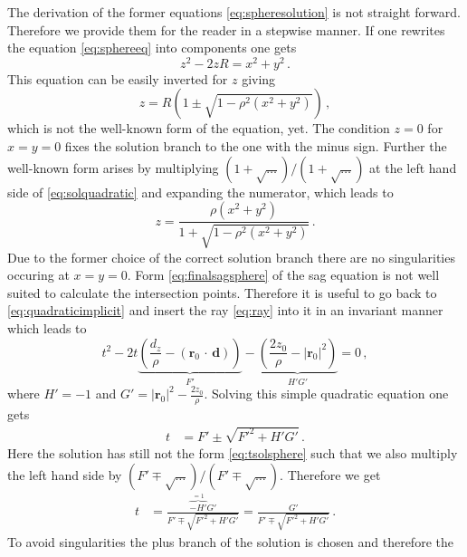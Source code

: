 \documentclass[12pt,a4paper,twoside,openright,BCOR10mm,headsepline,titlepage,abstracton,chapterprefix,final]{scrreprt}
\newcommand\Vector[1]{{\mathbf{#1}}}
\newcommand\Location{\Vector{r}}
\newcommand{\scpm}[2]{(#1\,\cdot\,#2)}
\newif\ifdraft
\begin{document}
\ifdraft
The derivation of the former equations \eqref{eq:spheresolution} is not straight forward. Therefore we provide them for the reader in a stepwise manner.
If one rewrites the equation \eqref{eq:sphereeq} into components one gets
\begin{equation}
 z^2 - 2 z R = x^2 + y^2 \label{eq:quadraticimplicit}\,.
\end{equation}
This equation can be easily inverted for $z$ giving
\begin{equation}
 z = R \left(1\pm\sqrt{1 - \rho^2 (x^2 + y^2)}\right)\label{eq:solquadratic}\,,
\end{equation}
which is not the well-known form of the equation, yet.
The condition $z=0$ for $x=y=0$ fixes the solution branch to the one 
with the minus sign. Further the well-known form arises by multiplying 
$(1+ \sqrt{\dots})/(1+\sqrt{\dots})$ at the left hand side
of \eqref{eq:solquadratic} and expanding the numerator, which leads to
\begin{equation}
 z = \frac{\rho (x^2 + y^2)}{1 + \sqrt{1 - \rho^2 (x^2 + y^2)}} \label{eq:finalsagsphere}\,.
\end{equation}
Due to the former choice of the correct solution branch there are no
singularities occuring at $x=y=0$. Form \eqref{eq:finalsagsphere} of the 
sag equation is not well suited to calculate the intersection points. Therefore it is 
useful to go back to \eqref{eq:quadraticimplicit} and insert the ray \eqref{eq:ray}
into it in an invariant manner which leads to
\begin{equation}
 t^2 - 2 t \underbrace{\left(\frac{d_z}{\rho} - \scpm{\Location_0}{\Vector{d}}\right)}_{F'} 
    - \underbrace{\left(\frac{2 z_0}{\rho} - |\Location_0|^2\right)}_{H' G'} = 0\,,\label{eq:teqsphere}
\end{equation}
where $H' = -1$ and $G' = |\Location_0|^2 - \tfrac{2 z_0}{\rho}$.
Solving this simple quadratic equation one gets
\begin{align}
 t &= F' \pm \sqrt{{F'}^2 + H' G'}\,.
\end{align}
Here the solution has still not the form \eqref{eq:tsolsphere} such that
we also multiply the left hand side by $(F' \mp \sqrt{\dots})/(F' \mp \sqrt{\dots})$.
Therefore we get
\begin{align}
 t &= \frac{\overbrace{-H'}^{=1} G'}{F' \mp \sqrt{{F'}^2 + H' G'}} = \frac{G'}{F' \mp \sqrt{{F'}^2 + H' G'}}\label{eq:tpresolutionsphere}\,.
\end{align}
To avoid singularities the plus branch of the solution is chosen and therefore the
\end{document}
